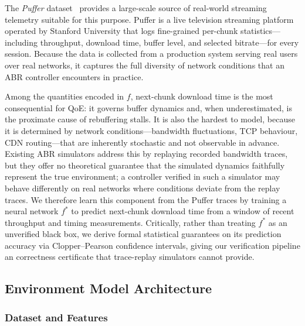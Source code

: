 \documentclass[thesis]{uofithesis} %
\begin{document}
    The \emph{Puffer} dataset~\cite{fugu} provides a large-scale source of
    real-world streaming telemetry suitable for this purpose.
    Puffer is a live television streaming platform operated by Stanford
    University that logs fine-grained per-chunk statistics---including
    throughput, download time, buffer level, and selected bitrate---for
    every session.
    Because the data is collected from a production system serving real
    users over real networks, it captures the full diversity of network
    conditions that an ABR controller encounters in practice.

    Among the quantities encoded in $f$, next-chunk download time is the
    most consequential for QoE: it governs buffer dynamics and, when
    underestimated, is the proximate cause of rebuffering stalls.  It is
    also the hardest to model, because it is determined by network
    conditions---bandwidth fluctuations, TCP behaviour, CDN routing---that
    are inherently stochastic and not observable in advance.  Existing ABR
    simulators address this by replaying recorded bandwidth traces, but
    they offer no theoretical guarantee that the simulated dynamics
    faithfully represent the true environment; a controller verified in
    such a simulator may behave differently on real networks where
    conditions deviate from the replay traces.  We therefore learn this
    component from the Puffer traces by training a neural network
    $f^{\ast}$ to predict next-chunk download time from a window of recent
    throughput and timing measurements.  Critically, rather than treating
    $f^{\ast}$ as an unverified black box, we derive formal statistical
    guarantees on its prediction accuracy via Clopper--Pearson confidence
    intervals, giving our verification pipeline an correctness
    certificate that trace-replay simulators cannot provide.


    \subsection{Environment Model Architecture}
    \label{sec:env-architecture}

    \subsubsection{Dataset and Features}
    \label{sec:env-data}
\end{document}
